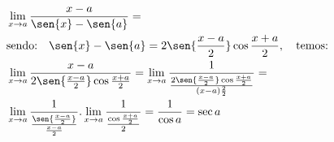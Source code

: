 \begin{ex}
\begin{align}
&\lim_{x\rightarrow a} \frac{x-a}{\sen{x}-\sen{a}}=\nonumber\\
&\text{sendo:}\quad \sen{x}-\sen{a} = 2\sen{\frac{x-a}{2}}\cos{\frac{x+a}{2}},\quad\text{temos:}\nonumber\\
&\lim_{x\rightarrow a} \frac{x-a}{2\sen{\frac{x-a}{2}}\cos{\frac{x+a}{2}}}=\lim_{x\rightarrow a} \frac{1}{\frac{2\sen{\frac{x-a}{2}}\cos{\frac{x+a}{2}}}{(x-a)\frac{2}{2}}}=\nonumber\\
&\lim_{x\rightarrow a} \frac{1}{\frac{\sen{\frac{x-a}{2}}}{\frac{x-a}{2}}}.\lim_{x\rightarrow a} \frac{1}{\frac{\cos{\frac{x+a}{2}}}{2}}=\frac{1}{\cos{a}}=\sec{a}\nonumber
\end{align}
\end{ex}